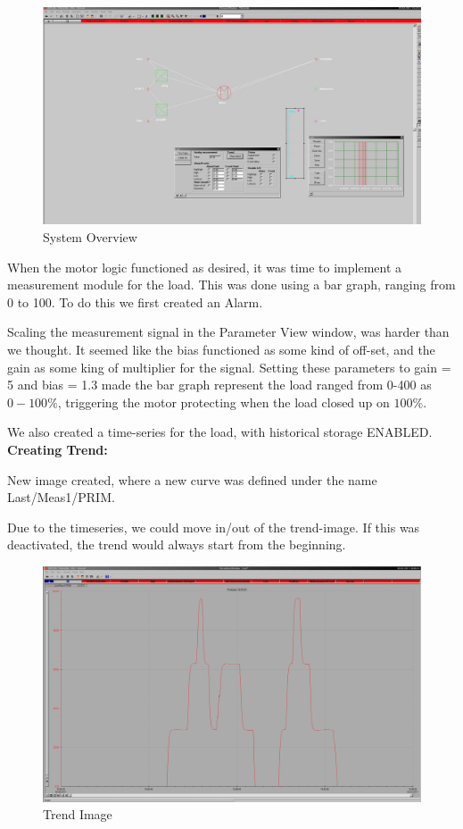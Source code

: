 \begin{figure}[t]
    \centering
    \centerline{\includegraphics[width=1.5\textwidth]{images/bilde1}}
    \caption{System Overview}
    \end{figure}
\newpage
When the motor logic functioned as desired, it was time to implement a measurement module for the load. This was done using a bar graph, ranging from 0 to 100. To do this we first created an Alarm. 

Scaling the measurement signal in the Parameter View window, was harder than we thought. It seemed like the bias functioned as some kind of off-set, and the gain as some king of multiplier for the signal. Setting these parameters to gain = 5 and bias = 1.3 made the bar graph represent the load ranged from 0-400 as $0-100\%$, triggering the motor protecting when the load closed up on $100\%$.

We also created a time-series for the load, with historical storage ENABLED.
\newpage
\textbf{Creating Trend:}

New image created, where a new curve was defined under the name Last/Meas1/PRIM.

Due to the timeseries, we could move in/out of the trend-image. If this was deactivated, the trend would always start from the beginning.

\begin{figure}[!htb]
    \centering
    \centerline{\includegraphics[width=1.5\textwidth]{images/Trend}}
    \caption{Trend Image}
    \end{figure}
    


